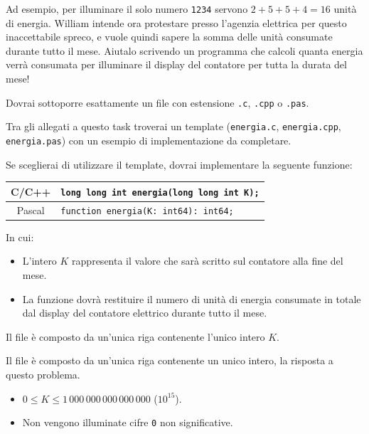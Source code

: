 Ad esempio, per illuminare il solo numero \texttt{1234} servono $2+5+5+4 = 16$ unità di energia. William intende ora protestare presso l'agenzia elettrica per questo inaccettabile spreco, e vuole quindi sapere la somma delle unità consumate durante tutto il mese. Aiutalo scrivendo un programma che calcoli quanta energia verrà consumata per illuminare il display del contatore per tutta la durata del mese!


\Implementation
Dovrai sottoporre esattamente un file con estensione \texttt{.c}, \texttt{.cpp} o \texttt{.pas}.

\begin{warning}
Tra gli allegati a questo task troverai un template (\texttt{energia.c}, \texttt{energia.cpp}, \texttt{energia.pas}) con un esempio di implementazione da completare.
\end{warning}

Se sceglierai di utilizzare il template, dovrai implementare la seguente funzione:
\begin{center}\begin{tabularx}{\textwidth}{|c|X|}
\hline
C/C++  & \verb|long long int energia(long long int K);|\\
\hline
Pascal & \verb|function energia(K: int64): int64;|\\
\hline
\end{tabularx}\end{center}
In cui:
\begin{itemize}[nolistsep]
  \item L'intero $K$ rappresenta il valore che sarà scritto sul contatore alla fine del mese.
  \item La funzione dovrà restituire il numero di unità di energia consumate in totale dal display del contatore elettrico durante tutto il mese.
\end{itemize}
\pagebreak

\InputFile
Il file  è composto da un'unica riga contenente l'unico intero $K$.

\OutputFile
Il file \outputfile{} è composto da un'unica riga contenente un unico intero, la risposta a questo problema.

\Constraints
\begin{itemize}[nolistsep, itemsep=2mm]
	\item $0 \le K \le 1\,000\,000\,000\,000\,000$ ($10^{15}$).
	\item Non vengono illuminate cifre \texttt{0} non significative.
\end{itemize}

